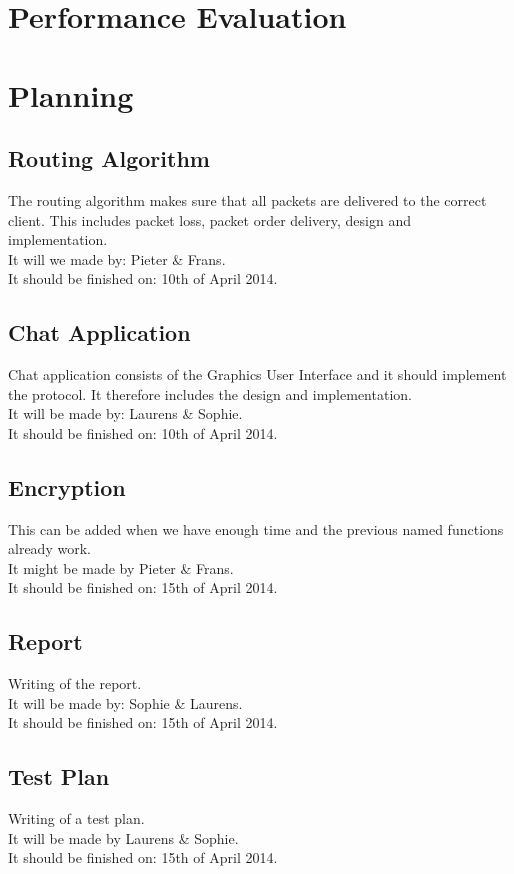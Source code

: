 \documentclass{report}
\begin{document}
\section{Performance Evaluation}

\section{Planning}
    \subsection{Routing Algorithm}
    The routing algorithm makes sure that all packets are delivered to the correct client. This includes packet loss, packet order delivery, design and implementation. \\
    It will we made by: Pieter \& Frans. \\
    It should be finished on: 10th of April 2014.

    \subsection{Chat Application}
    Chat application consists of the Graphics User Interface and it should implement the protocol. It therefore includes the design and implementation. \\
    It will be made by: Laurens \& Sophie. \\
    It should be finished on: 10th of April 2014.

    \subsection{Encryption}
    This can be added when we have enough time and the previous named functions already work. \\
    It might be made by Pieter \& Frans. \\
    It should be finished on: 15th of April 2014.

    \subsection{Report}
    Writing of the report. \\
    It will be made by: Sophie \& Laurens. \\
    It should be finished on: 15th of April 2014.

    \subsection{Test Plan}
    Writing of a test plan. \\
    It will be made by Laurens \& Sophie. \\
    It should be finished on: 15th of April 2014.
\end{document}
